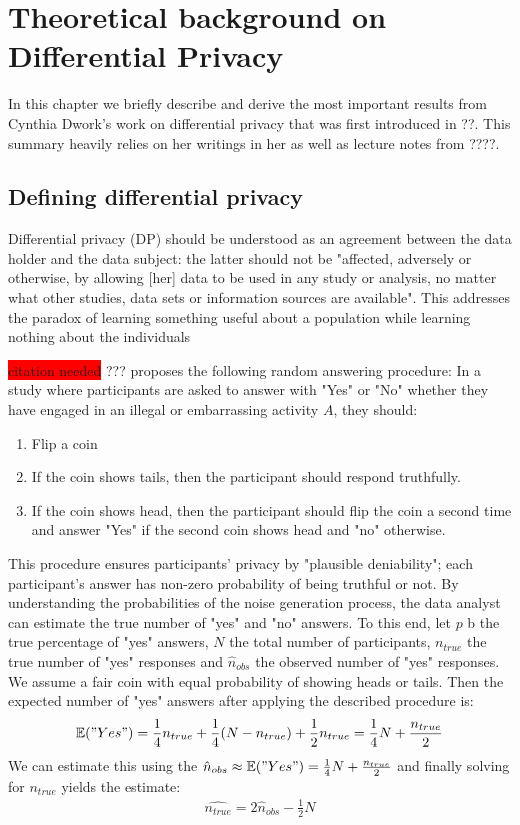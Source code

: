 \section{Theoretical background on Differential Privacy}

In this chapter we briefly describe and derive the most important results from Cynthia Dwork's work on differential privacy that was first introduced in ??. This summary heavily relies on her writings in her as well as lecture notes from ????.

\subsection{Defining differential privacy}
Differential privacy (DP) should be understood as an agreement between the data holder and the data subject: the latter should not be "affected, adversely or otherwise, by allowing [her] data to be used in any study or analysis, no matter what other studies, data sets or information sources are available". This addresses the paradox of learning something useful about a population while learning nothing about the individuals


\begin{ex}
    \colorbox{red}{citation needed} ??? proposes the following random answering procedure: In a study where participants are asked to answer with "Yes" or "No" whether they have engaged in an illegal or embarrassing activity $A$, they should:
    \begin{enumerate}
        \item Flip a coin
        \item If the coin shows tails, then the participant should respond truthfully.
        \item If the coin shows head, then the participant should flip the coin a second time and answer "Yes" if the second coin shows head and "no" otherwise.
    \end{enumerate}
    This procedure ensures participants' privacy by "plausible deniability"; each participant's answer has non-zero probability of being truthful or not. By understanding the probabilities of the noise generation process, the data analyst can estimate the true number of "yes" and "no" answers. To this end, let $p$ b the true percentage of "yes" answers, $N$ the total number of participants, $n_{true}$ the true number of "yes" responses and $\hat{n}_{obs}$ the observed number of "yes" responses. We assume a fair coin with equal probability of showing heads or tails. Then the expected number of "yes" answers after applying the described procedure is:
    \begin{align}
        \mathbb{E}("Yes") = \frac{1}{4} n_{true} + \frac{1}{4} (N-n_{true}) + \frac{1}{2} n_{true} = \frac{1}{4} N + \frac{n_{true}}{2}
    \end{align}
    We can estimate this using the $\hat{n}_{obs} \approx \mathbb{E}("Yes") = \frac{1}{4} N + \frac{n_{true}}{2}$ and finally solving for $n_{true}$ yields the estimate:
    \begin{align}
        \hat{n_{true}} = 2 \hat{n}_{obs} - \frac{1}{2} N
    \end{align}
\end{ex}


